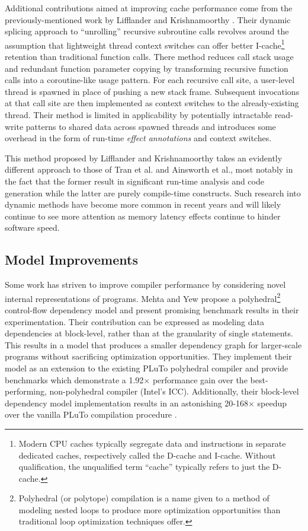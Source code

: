 \documentclass[nobib]{tufte-handout}
\begin{document}
Additional contributions aimed at improving cache performance come from the previously-mentioned work by Lifflander and Krishnamoorthy \cite{Lifflander}.  Their dynamic splicing approach to ``unrolling'' recursive subroutine calls revolves around the assumption that lightweight thread context switches can offer better I-cache\footnote{Modern CPU caches typically segregate data and instructions in separate dedicated caches, respectively called the D-cache and I-cache.  Without qualification, the unqualified term ``cache'' typically refers to just the D-cache.} retention than traditional function calls.  There method reduces call stack usage and redundant function parameter copying by transforming recursive function calls into a coroutine-like usage pattern.  For each recursive call site, a user-level thread is spawned in place of pushing a new stack frame.  Subsequent invocations at that call site are then implemented as context switches to the already-existing thread.  Their method is limited in applicability by potentially intractable read-write patterns to shared data across spawned threads and introduces some overhead in the form of run-time \emph{effect annotations} and context switches. 

This method proposed by Lifflander and Krishnamoorthy takes an evidently different approach to those of Tran et al. and Ainsworth et al., most notably in the fact that the former result in significant run-time analysis and code generation while the latter are purely compile-time constructs.  Such research into dynamic methods have become more common in recent years and will likely continue to see more attention as memory latency effects continue to hinder software speed.  


\subsection{Model Improvements}
Some work has striven to improve compiler performance by considering novel internal representations of programs.  Mehta and Yew propose a polyhedral\footnote{Polyhedral (or polytope) compilation is a name given to a method of modeling nested loops to produce more optimization opportunities than traditional loop optimization techniques offer.} control-flow dependency model and present promising benchmark results in their experimentation.  Their contribution can be expressed as modeling data dependencies at block-level, rather than at the granularity of single statements.  This results in a model that produces a smaller dependency graph for larger-scale programs without sacrificing optimization opportunities.  They implement their model as an extension to the existing PLuTo polyhedral compiler and provide benchmarks which demonstrate a 1.92$\times$ performance gain\cite{Mehta} over the best-performing, non-polyhedral compiler (Intel's ICC).  Additionally, their block-level dependency model implementation results in an astonishing 20-168$\times$ speedup over the vanilla PLuTo compilation procedure \cite{Mehta}.
\end{document}
